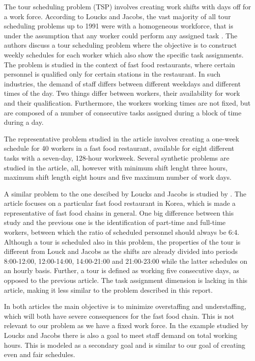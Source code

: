 The tour scheduling problem (TSP) involves creating work shifts with days off for a work force. According to Loucks and Jacobs, the vast majority of all tour scheduling problems up to 1991 were with a homogeneous workforce, that is under the assumption that any worker could perform any assigned task \cite{loucks_1991}. The authors discuss a tour scheduling problem where the objective is to construct weekly schedules for each worker which also show the specific task assignments. The problem is studied in the context of fast food restaurants, where certain personnel is qualified only for certain stations in the restaurant. In such industries, the demand of staff differs between different weekdays and different times of the day. Two things differ between workers, their availability for work and their qualification. Furthermore, the workers working times are not fixed, but are composed of a number of consecutive tasks assigned during a block of time during a day.

The representative problem studied in the article involves creating a one-week schedule for 40 workers in a fast food restaurant, available for eight different tasks with a seven-day, 128-hour workweek. Several synthetic problems are studied in the article, all, however with minimum shift lenght three hours, maximum shift length eight hours and five maximum number of work days.

A similar problem to the one descibed by Loucks and Jacobs is studied by \cite{choi_hwang_park_2009}. The article focuses on a particular fast food restaurant in Korea, which is made a representative of fast food chains in general. One big difference between this study and the previous one is the identification of part-time and full-time workers, between which the ratio of scheduled personnel should always be 6:4. Although a tour is scheduled also in this problem, the properties of the tour is different from Louck and Jacobs as the shifts are already divided into periods 8:00-12:00, 12:00-14:00, 14:00-21:00 and 21:00-23:00 while the latter schedules on an hourly basis. Further, a tour is defined as working five consecutive days, as opposed to the previous article. The task assignment dimension is lacking in this article, making it less similar to the problem described in this report.

In both articles the main objective is to minimize overstaffing and understaffing, which will both have severe consequences for the fast food chain. This is not relevant to our problem as we have a fixed work force. In the example studied by Loucks and Jacobs there is also a goal to meet staff demand on total working hours. This is modeled as a secondary goal and is similar to our goal of creating even and fair schedules.


